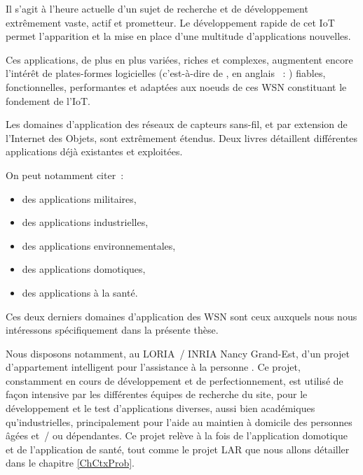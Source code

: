 Il s'agit à l'heure actuelle d'un sujet de recherche et de développement
extrêmement vaste, actif et prometteur. Le développement rapide de cet IoT
permet l'apparition et la mise en place d'une multitude d'applications
nouvelles.

Ces applications, de plus en plus variées, riches et complexes, augmentent
encore l'intérêt de plates-formes logicielles (c'est-à-dire de
, en anglais ~:
) fiables, fonctionnelles, performantes et adaptées aux noeuds
de ces WSN constituant le fondement de l'IoT.


\bigskip

Les domaines d'application des réseaux de capteurs sans-fil, et par
extension de l'Internet des Objets, sont extrêmement étendus.
Deux livres \cite{LivreDargie2010} \cite{LivreAkyildiz2010}
détaillent différentes applications déjà existantes et exploitées.

On peut notamment citer~:

\begin{itemize}

\item des applications militaires,

\item des applications industrielles,

\item des applications environnementales,

\item des applications domotiques,

\item des applications à la santé.

\end{itemize}

Ces deux derniers domaines d'application des WSN sont ceux auxquels nous
nous intéressons spécifiquement dans la présente thèse.

Nous disposons notamment, au LORIA~/ INRIA Nancy Grand-Est,
d'un projet d'appartement intelligent pour l'assistance à la personne
\cite{AppartIntelligent}. Ce projet, constamment en cours de développement
et de perfectionnement, est utilisé de façon intensive par les différentes
équipes de recherche du site, pour le développement et le test
d'applications diverses, aussi bien académiques qu'industrielles,
principalement pour l'aide au maintien à domicile des personnes âgées
et~/ ou dépendantes. Ce projet relève à la fois de l'application
domotique et de l'application de santé, tout comme le projet LAR
que nous allons détailler dans le chapitre \ref{ChCtxProb}.

